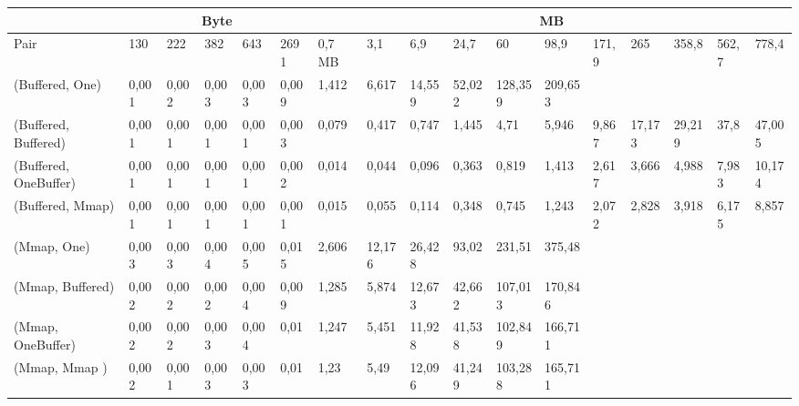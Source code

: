 \documentclass[12pt]{article}
\begin{document}
\begin{table}[H]
\tiny
\begin{adjustwidth}{-3.5cm}{-3cm}
\begin{tabular}{|l|l|l|l|l|l|l|l|l|l|l|l|l|l|l|l|l|}
\hline
                      & \multicolumn{5}{c|}{Byte}             & \multicolumn{11}{c|}{MB}                                                                         \\ \hline
Pair                  & 130   & 222   & 382   & 643   & 2691  & 0,7 MB & 3,1    & 6,9    & 24,7   & 60      & 98,9    & 171,9 & 265    & 358,8  & 562,7 & 778,4  \\ \hline
(Buffered, One)       & 0,001 & 0,002 & 0,003 & 0,003 & 0,009 & 1,412  & 6,617  & 14,559 & 52,022 & 128,359 & 209,653 &       &        &        &       &        \\ \hline
(Buffered, Buffered)  & 0,001 & 0,001 & 0,001 & 0,001 & 0,003 & 0,079  & 0,417  & 0,747  & 1,445  & 4,71    & 5,946   & 9,867 & 17,173 & 29,219 & 37,8  & 47,005 \\ \hline
(Buffered, OneBuffer) & 0,001 & 0,001 & 0,001 & 0,001 & 0,002 & 0,014  & 0,044  & 0,096  & 0,363  & 0,819   & 1,413   & 2,617 & 3,666  & 4,988  & 7,983 & 10,174 \\ \hline
(Buffered, Mmap)      & 0,001 & 0,001 & 0,001 & 0,001 & 0,001 & 0,015  & 0,055  & 0,114  & 0,348  & 0,745   & 1,243   & 2,072 & 2,828  & 3,918  & 6,175 & 8,857  \\ \hline
(Mmap, One)           & 0,003 & 0,003 & 0,004 & 0,005 & 0,015 & 2,606  & 12,176 & 26,428 & 93,02  & 231,51  & 375,48  &       &        &        &       &        \\ \hline
(Mmap, Buffered)      & 0,002 & 0,002 & 0,002 & 0,004 & 0,009 & 1,285  & 5,874  & 12,673 & 42,662 & 107,013 & 170,846 &       &        &        &       &        \\ \hline
(Mmap, OneBuffer)     & 0,002 & 0,002 & 0,003 & 0,004 & 0,01  & 1,247  & 5,451  & 11,928 & 41,538 & 102,849 & 166,711 &       &        &        &       &        \\ \hline
(Mmap, Mmap )         & 0,002 & 0,001 & 0,003 & 0,003 & 0,01  & 1,23   & 5,49   & 12,096 & 41,249 & 103,288 & 165,711 &       &        &        &       &        \\ \hline
\end{tabular}
\end{adjustwidth}
\end{table}
\end{document}
